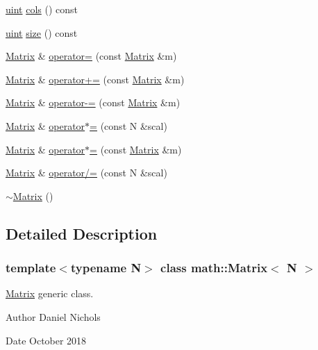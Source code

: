 \begin{DoxyCompactItemize}
\item 
\hyperlink{typedefs_8h_a7b9b9413622e67b9df7f2d090b48682b}{uint} \hyperlink{classmath_1_1Matrix_ad78b49e12a607856df124a18a855aaf1}{cols} () const
\item 
\hyperlink{typedefs_8h_a7b9b9413622e67b9df7f2d090b48682b}{uint} \hyperlink{classmath_1_1Matrix_ae99135c51efc0077b694ab37ad64d5c0}{size} () const
\item 
\hyperlink{classmath_1_1Matrix}{Matrix} \& \hyperlink{classmath_1_1Matrix_a8bf5d371b703ef3023742c4058f709a7}{operator=} (const \hyperlink{classmath_1_1Matrix}{Matrix} \&m)
\item 
\hyperlink{classmath_1_1Matrix}{Matrix} \& \hyperlink{classmath_1_1Matrix_ae2944c1e1a0f1958101db2197bcfaa3c}{operator+=} (const \hyperlink{classmath_1_1Matrix}{Matrix} \&m)
\item 
\hyperlink{classmath_1_1Matrix}{Matrix} \& \hyperlink{classmath_1_1Matrix_a046b9f4717da34fb08795cb461497084}{operator-\/=} (const \hyperlink{classmath_1_1Matrix}{Matrix} \&m)
\item 
\hyperlink{classmath_1_1Matrix}{Matrix} \& \hyperlink{classmath_1_1Matrix_aa5af962938db227b32efbf3ccb34ddba}{operator$\ast$=} (const N \&scal)
\item 
\hyperlink{classmath_1_1Matrix}{Matrix} \& \hyperlink{classmath_1_1Matrix_ad5bce304ff86d69014b10c3e3a58b8a7}{operator$\ast$=} (const \hyperlink{classmath_1_1Matrix}{Matrix} \&m)
\item 
\hyperlink{classmath_1_1Matrix}{Matrix} \& \hyperlink{classmath_1_1Matrix_a6a0a90575952ca84cac100cb40a5e9d0}{operator/=} (const N \&scal)
\item 
\hyperlink{classmath_1_1Matrix_afd52712eaef5a16115d605b7866a0576}{$\sim$\+Matrix} ()
\end{DoxyCompactItemize}


\subsection{Detailed Description}
\subsubsection*{template$<$typename N$>$\newline
class math\+::\+Matrix$<$ N $>$}

\hyperlink{classmath_1_1Matrix}{Matrix} generic class. 

\begin{DoxyAuthor}{Author}
Daniel Nichols 
\end{DoxyAuthor}
\begin{DoxyDate}{Date}
October 2018 
\end{DoxyDate}


